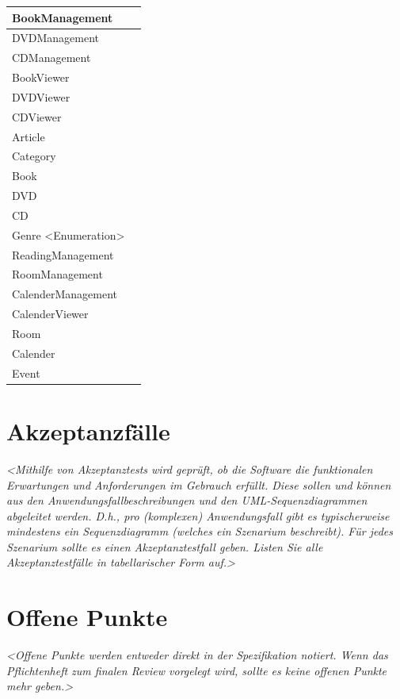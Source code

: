 \documentclass[a4paper]{article}
\begin{document}
\begin{tabular}{|l|l|}
	BookManagement &  \\ \hline
	DVDManagement &  \\ \hline
	CDManagement &  \\ \hline
	BookViewer &  \\ \hline
	DVDViewer &  \\ \hline
	CDViewer &  \\ \hline
	Article &  \\ \hline
	Category &  \\ \hline
	Book &  \\ \hline
	DVD &  \\ \hline
	CD &  \\ \hline
	Genre <Enumeration> &  \\ \hline
	ReadingManagement &  \\ \hline
	RoomManagement &  \\ \hline
	CalenderManagement &  \\ \hline
	CalenderViewer &  \\ \hline
	Room &  \\ \hline
	Calender &  \\ \hline
	Event &  \\ \hline
\end{tabular}


\section{Akzeptanzfälle}

\textit{
<Mithilfe von Akzeptanztests wird geprüft, ob die Software die funktionalen Erwartungen und Anforderungen im Gebrauch erfüllt. Diese sollen und können aus den Anwendungsfallbeschreibungen und den UML-Sequenzdiagrammen abgeleitet werden. D.h., pro (komplexen) Anwendungsfall gibt es typischerweise mindestens ein Sequenzdiagramm (welches ein Szenarium beschreibt). Für jedes Szenarium sollte es einen Akzeptanztestfall geben. Listen Sie alle Akzeptanztestfälle in tabellarischer Form auf.> 
}

\section{Offene Punkte}

\textit{
<Offene Punkte werden entweder direkt in der Spezifikation notiert. Wenn das Pflichtenheft  zum finalen Review vorgelegt wird, sollte es keine offenen Punkte mehr geben.>
}
\end{document}

